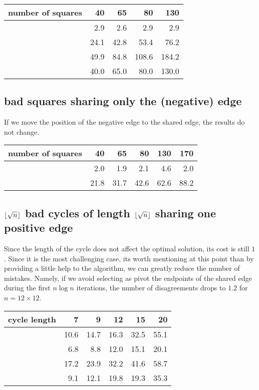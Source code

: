 \begin{center}
\begin{tabular}{lrrrr}
\toprule
number of squares & 40   & 65   & 80    & 130 \\
\midrule
\pot{}            & 2.9  & 2.6  & 2.9   & 2.9 \\
\pat{}            & 24.1 & 42.8 & 53.4  & 76.2 \\
\nnot{}           & 49.9 & 84.8 & 108.6 & 184.2 \\
\nat{}            & 40.0 & 65.0 & 80.0  & 130.0\\
\bottomrule
\end{tabular}
\end{center}


\subsection{bad squares sharing only the (negative) edge}

If we move the position of the negative edge to the shared edge, the results
do not change.

\begin{center}
\begin{tabular}{lrrrrr}
\toprule
number of squares &  40  &  65  &  80  &  130 &  170 \\
\midrule
\pot{} &  2.0 &  1.9 &  2.1 &  4.6 &  2.0 \\
\pat{} & 21.8 & 31.7 & 42.6 & 62.6 & 88.2 \\
\bottomrule
\end{tabular}
\end{center}

\subsection{$\floor*{\sqrt{n}}$ bad cycles of length $\floor*{\sqrt{n}}$
	sharing one positive edge}
\label{sub:mixed}

Since the length of the cycle does not affect the optimal solution, its cost
is still $1$. Since it is the most challenging case, its worth mentioning at
this point than by providing a little help to the algorithm, we can greatly
reduce the number of mistakes. Namely, if we avoid selecting as pivot the
endpoints of the shared edge during the first $n\log n$ iterations, the
number of disagreements drops to $1.2$ for $n=12\times 12$.

\begin{center}
\begin{tabular}{lrrrrr}
\toprule
cycle length & 7    & 9    & 12   & 15   & 20 \\
\midrule
\pot{}       & 10.6 & 14.7 & 16.3 & 32.5 & 55.1 \\
\pat{}       & 6.8  & 8.8  & 12.0 & 15.1 & 20.1 \\
\nnot{}      & 17.2 & 23.9 & 32.2 & 41.6 & 58.7 \\
\nat{}       & 9.1  & 12.1 & 19.8 & 19.3 & 35.3 \\
\bottomrule
\end{tabular}
\end{center}


